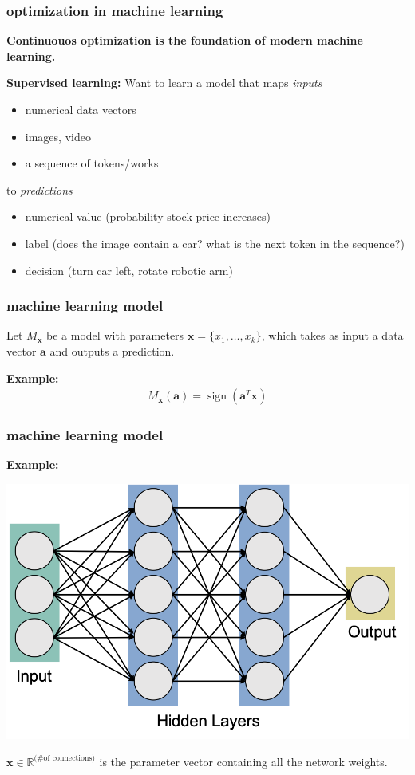 \documentclass[compress]{beamer}
\newcommand{\bv}[1]{\mathbf{#1}}
\newcommand{\R}{\mathbb{R}}
\DeclareMathOperator{\sign}{sign}
\begin{document}
\begin{frame}
	\frametitle{optimization in machine learning}
	\begin{center}
		\alert{\textbf{Continuouos optimization is the foundation of modern machine learning.}}
	\end{center}
	\textbf{Supervised learning:} Want to learn a model that maps \emph{inputs}
	\begin{itemize}
		\item numerical data vectors
		\item images, video
		\item a sequence of tokens/works
	\end{itemize} 
	
	to \emph{predictions}
	\begin{itemize}
		\item numerical value (probability stock price increases)
		\item label (does the image contain a car? what is the next token in the sequence?)
		\item decision (turn car left, rotate robotic arm)
	\end{itemize} 
\end{frame}

\begin{frame}
	\frametitle{machine learning model}
	\begin{center}
		Let $M_{\bv{x}}$ be a model with parameters $\bv{x} = \{x_1, \ldots, x_k\}$, which takes as input a data vector $\bv{a}$ and outputs a prediction.
	\end{center}
	
	\textbf{Example:}
	\begin{align*}
		M_{\bv{x}}(\bv{a}) = \sign(\bv{a}^T\bv{x})
	\end{align*}		
\end{frame}

\begin{frame}[t]
	\frametitle{machine learning model}
	\textbf{Example:}
	\begin{center}
		\includegraphics[width=.7\textwidth]{neuralNetwork.png}
	\end{center}	
	$\bv{x}\in \R^{\text{(\# of connections)}}$ is the parameter vector containing all the network weights. 	
\end{frame}
\end{document}
